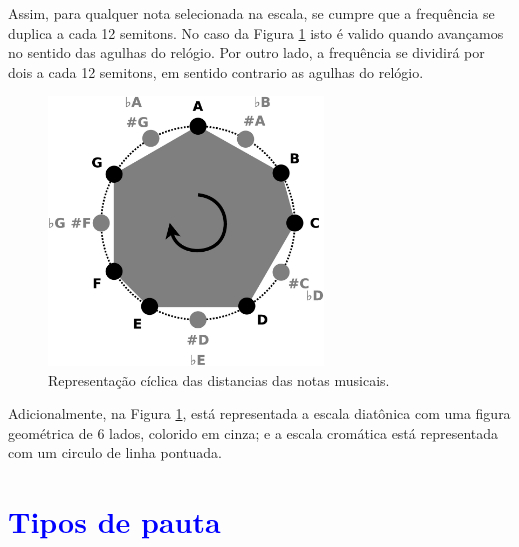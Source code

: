 Assim, para qualquer nota selecionada na escala, 
se cumpre que a frequência se duplica a cada 12 semitons.
No caso da Figura \ref{fig:circulonotas} isto é valido quando avançamos no sentido das agulhas do relógio.
Por outro lado, a frequência se dividirá por dois a cada 12 semitons,
em sentido contrario as agulhas do relógio.
    \begin{figure}[h]
        \centering
        \includegraphics[width=0.65\textwidth]{chapters/cap-musica-basica/circulonotas.eps}
        \caption{Representação cíclica das distancias das notas musicais.}
        \label{fig:circulonotas}
    \end{figure}

Adicionalmente, na Figura \ref{fig:circulonotas}, 
está representada a escala diatônica com uma figura geométrica de 6 lados, 
colorido em cinza; e a escala cromática está representada com um circulo de linha pontuada.




\section{\textcolor{blue}{Tipos de pauta}}
\label{sec:tipospauta}

